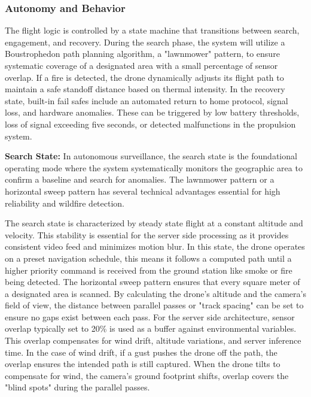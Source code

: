 \documentclass[journal, onecolumn]{IEEEtran}
\begin{document}
\subsubsection{Autonomy and Behavior}
The flight logic is controlled by a state machine that transitions between search, engagement, and recovery. During the search phase, the system will utilize a Boustrophedon path planning algorithm, a "lawnmower" pattern, to ensure systematic coverage of a designated area with a small percentage of sensor overlap. If a fire is detected, the drone dynamically adjusts its flight path to maintain a safe standoff distance based on thermal intensity. In the recovery state, built-in fail safes include an automated return to home protocol, signal loss, and hardware anomalies. These can be triggered by low battery thresholds, loss of signal exceeding five seconds, or detected malfunctions in the propulsion system.

\vspace{0.5em}

\textbf{Search State:} In autonomous surveillance, the search state is the foundational operating mode where the system systematically monitors the geographic area to confirm a baseline and search for anomalies. The lawnmower pattern or a horizontal sweep pattern has several technical advantages essential for high reliability and wildfire detection.

The search state is characterized by steady state flight at a constant altitude and velocity. This stability is essential for the server side processing as it provides consistent video feed and minimizes motion blur. In this state, the drone operates on a preset navigation schedule, this means it follows a computed path until a higher priority command is received from the ground station like smoke or fire being detected. The horizontal sweep pattern ensures that every square meter of a designated area is scanned. By calculating the drone's altitude and the camera's field of view, the distance between parallel passes or "track spacing" can be set to ensure no gaps exist between each pass. For the server side architecture, sensor overlap typically set to 20\% is used as a buffer against environmental variables. This overlap compensates for wind drift, altitude variations, and server inference time. In the case of wind drift, if a gust pushes the drone off the path, the overlap ensures the intended path is still captured. When the drone tilts to compensate for wind, the camera's ground footprint shifts, overlap covers the "blind spots" during the parallel passes. 
\end{document}
